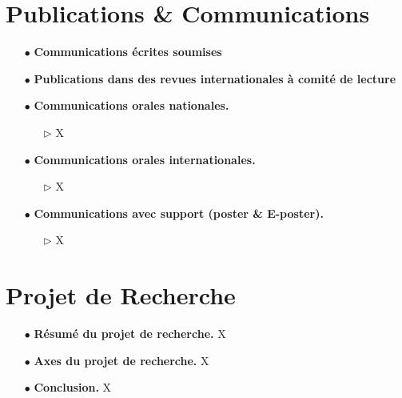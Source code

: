 \documentclass[a4paper, 12pt, twoside, openright]{article}
\begin{document}
\section{Publications \& Communications}\label{C}
\begin{itemize}
\item[\color{MagSombre}$\bullet$] \textbf{\color{MagSombre} Communications écrites soumises}

\item[\color{MagSombre}$\bullet$] \textbf{\color{MagSombre} Publications dans des revues internationales à comité de lecture}

\item[\color{MagSombre}$\bullet$] \textbf{\color{MagSombre}Communications orales nationales.}
\begin{itemize}
\item[$\triangleright$] X
\end{itemize}

\item[\color{MagSombre}$\bullet$] \textbf{\color{MagSombre}Communications orales internationales.}
\begin{itemize}
\item[$\triangleright$] X
\end{itemize}
\item[\color{MagSombre}$\bullet$] \textbf{\color{MagSombre}Communications avec support (poster \& E-poster).} \begin{itemize}
\item[$\triangleright$] X
\end{itemize}
\end{itemize}

\newpage
\section{Projet de Recherche}
\begin{itemize}
\item[\color{MagSombre}$\bullet$] \textbf{\color{MagSombre}Résumé du projet de recherche.} X\\

\item[\color{MagSombre}$\bullet$] \textbf{\color{MagSombre}Axes du projet de recherche.} X\\ 

\item[\color{MagSombre}$\bullet$]\textbf{\color{MagSombre}Conclusion.} X \\
\end{itemize} 
 
\addtocounter{section}{1}



 
\end{document}
